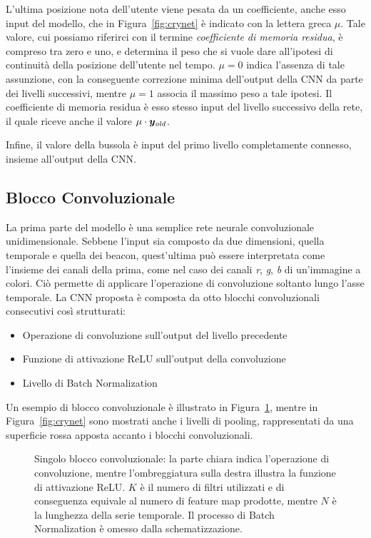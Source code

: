L'ultima posizione nota dell'utente viene pesata da un coefficiente, anche esso
input del modello, che in Figura~\ref{fig:crynet} è indicato con la lettera
greca \(\mu\). Tale valore, cui possiamo riferirci con il termine
\emph{coefficiente di memoria residua}, è compreso tra zero e uno, e determina
il peso che si vuole dare all'ipotesi di continuità della posizione dell'utente
nel tempo. \(\mu = 0\) indica l'assenza di tale assunzione, con la conseguente
correzione minima dell'output della CNN da parte dei livelli successivi, mentre
\(\mu = 1 \) associa il massimo peso a tale ipotesi. Il coefficiente di memoria
residua è esso stesso input del livello successivo della rete, il quale riceve
anche il valore \(\mu \cdot \bm y_{\mathit{old}}\).

Infine, il valore della bussola è input del primo livello completamente connesso,
insieme all'output della CNN\@.
\subsection{Blocco Convoluzionale}
La prima parte del modello è una semplice rete neurale convoluzionale
unidimensionale. Sebbene l'input sia composto da due dimensioni, quella
temporale e quella dei beacon, quest'ultima può essere interpretata come
l'insieme dei canali della prima, come nel caso dei canali \emph{r}, \emph{g},
\emph{b} di un'immagine a colori. Ciò permette di applicare l'operazione di
convoluzione soltanto lungo l'asse temporale.  La CNN proposta è composta da
otto blocchi convoluzionali consecutivi così strutturati:
\begin{itemize}
    \item Operazione di convoluzione sull'output del livello precedente
    \item Funzione di attivazione ReLU sull'output della convoluzione
    \item Livello di Batch Normalization\cite{batchnorm}
\end{itemize}
Un esempio di blocco convoluzionale è illustrato in Figura~\ref{fig:cnnblock},
mentre in Figura~\ref{fig:crynet} sono mostrati anche i livelli di pooling,
rappresentati da una superficie rossa apposta accanto i blocchi convoluzionali.
\begin{figure}
  \caption{Singolo blocco convoluzionale: la parte chiara indica l'operazione
    di convoluzione, mentre l'ombreggiatura sulla destra illustra la funzione
    di attivazione ReLU\@. \(K\) è il numero di filtri utilizzati e di
    conseguenza equivale al numero di feature map prodotte, mentre \(N\) è la
    lunghezza della serie temporale. Il processo di Batch Normalization è
    omesso dalla schematizzazione.}%
  \label{fig:cnnblock}%
\end{figure}


